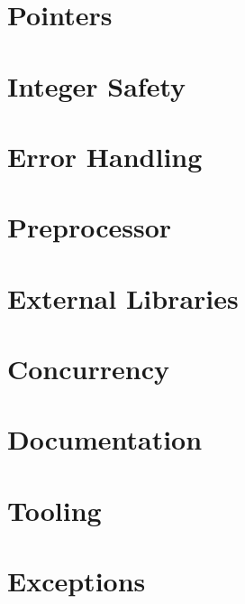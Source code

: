 \section{Pointers}


\section{Integer Safety}


\section{Error Handling}


\section{Preprocessor}


\section{External Libraries}


\section{Concurrency}


\section{Documentation}


\section{Tooling}


\section{Exceptions}
